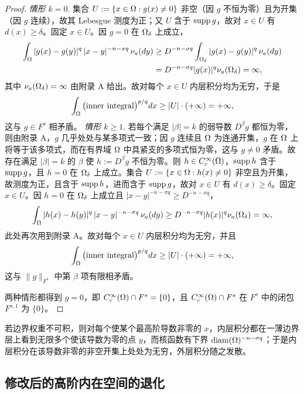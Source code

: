 \begin{proof}
\emph{情形 $k=0$}. 集合 $U:=\{x\in\Omega : g(x)\ne 0\}$ 非空（因 $g$ 不恒为零）且为开集（因 $g$ 连续），故其 Lebesgue 测度为正；又 $U$ 含于 $\operatorname{supp} g$，故对 $x\in U$ 有 $d(x)\ge\delta$。固定 $x\in U$。因 $g=0$ 在 $\Omega_\delta$ 上成立，
\begin{align*}
  \int_\Omega |g(x)-g(y)|^q\,|x-y|^{-n-\sigma q}\,\nu_{a}(dy)
  &\ge D^{-n-\sigma q}\int_{\Omega_\delta}|g(x)-g(y)|^q\,\nu_{a}(dy)\\
  &=D^{-n-\sigma q}|g(x)|^q\nu_{a}(\Omega_\delta)=\infty ,
\end{align*}
其中 $\nu_{a}(\Omega_\delta)=\infty$ 由附录 A 给出。故对每个 $x\in U$ 内层积分均为无穷，于是
\[
  \int_\Omega\big(\text{inner integral}\big)^{p/q}dx\ge|U|\cdot(+\infty)=+\infty ,
\]
这与 $g\in F^s$ 相矛盾。
\emph{情形 $k\ge1$}. 若每个满足 $|\beta|=k$ 的弱导数 $D^\beta g$ 都恒为零，则由附录 A，$g$ 几乎处处与某多项式一致；因 $g$ 连续且 $\Omega$ 为连通开集，$g$ 在 $\Omega$ 上将等于该多项式，而在有界域 $\Omega$ 中具紧支的多项式恒为零，这与 $g\ne0$ 矛盾。故存在满足 $|\beta|=k$ 的 $\beta$ 使 $h:=D^\beta g$ 不恒为零。则 $h\in C_c^\infty(\Omega)$，$\operatorname{supp} h$ 含于 $\operatorname{supp} g$，且 $h=0$ 在 $\Omega_\delta$ 上成立。集合 $U:=\{x\in\Omega : h(x)\ne0\}$ 非空且为开集，故测度为正，且含于 $\operatorname{supp} h$，进而含于 $\operatorname{supp} g$，故对 $x\in U$ 有 $d(x)\ge\delta$。固定 $x\in U$。因 $h=0$ 在 $\Omega_\delta$ 上成立且 $|x-y|^{-n-\sigma q}\ge D^{-n-\sigma q}$，
\[
  \int_\Omega |h(x)-h(y)|^q\,|x-y|^{-n-\sigma q}\,\nu_{a}(dy)
  \ge D^{-n-\sigma q}|h(x)|^q\nu_{a}(\Omega_\delta)=\infty ,
\]
此处再次用到附录 A。故对每个 $x\in U$ 内层积分均为无穷，并且
\[
  \int_\Omega\big(\text{inner integral}\big)^{p/q}dx\ge|U|\cdot(+\infty)=+\infty ,
\]
这与 $\|g\|_{F^s}$ 中第 $\beta$ 项有限相矛盾。

两种情形都得到 $g=0$，即 $C_c^\infty(\Omega)\cap F^s=\{0\}$，且 $C_c^\infty(\Omega)\cap F^s$ 在 $F^s$ 中的闭包 $F^{s,1}$ 为 $\{0\}$。
\end{proof}

\begin{remark}[直觉]
若边界权重不可积，则对每个使某个最高阶导数非零的 $x$，内层积分都在一薄边界层上看到无限多个使该导数为零的点 $y$，而核函数有下界 $\operatorname{diam}(\Omega)^{-n-\sigma q}$；于是内层积分在该导数非零的非空开集上处处为无穷，外层积分随之发散。
\end{remark}

\subsection{修改后的高阶内在空间的退化}


